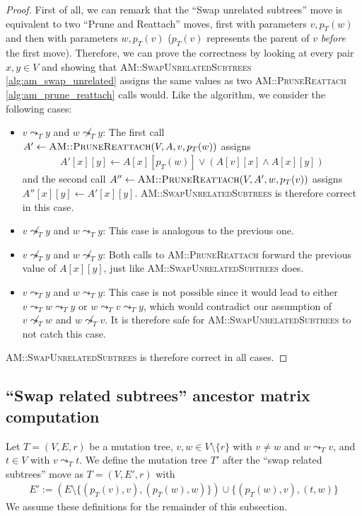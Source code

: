 \begin{proof}
    First of all, we can remark that the ``Swap unrelated subtrees'' move is equivalent to two ``Prune and Reattach'' moves, first with parameters $v, p_T(w)$ and then with parameters $w, p_T(v)$ ($p_T(v)$ represents the parent of $v$ \textit{before} the first move). Therefore, we can prove the correctness by looking at every pair $x,y \in V$ and showing that \textsc{AM::SwapUnrelatedSubtrees} \ref{alg:am_swap_unrelated} assigns the same values as two \textsc{AM::PruneReattach} \ref{alg:am_prune_reattach} calls would. Like the algorithm, we consider the following cases:
    \begin{itemize}
        \item $v \leadsto_T y$ and $w \not\leadsto_T y$: The first call $A' \leftarrow \textsc{AM::PruneReattach}(V, A, v, p_T(w))$ assigns 
        \begin{align*}
            A'[x][y] \leftarrow A[x][p_T(w)] \vee (A[v][x] \wedge A[x][y])
        \end{align*}
        and the second call $A'' \leftarrow \textsc{AM::PruneReattach}(V, A', w, p_T(v))$ assigns $A''[x][y] \leftarrow A'[x][y]$. \textsc{AM::SwapUnrelatedSubtrees} is therefore correct in this case.
        \item $v \not\leadsto_T y$ and $w \leadsto_T y$: This case is analogous to the previous one.
        \item $v \not\leadsto_T y$ and $w \not\leadsto_T y$: Both calls to \textsc{AM::PruneReattach} forward the previous value of $A[x][y]$, just like \textsc{AM::SwapUnrelatedSubtrees} does.
        \item $v \leadsto_T y$ and $w \leadsto_T y$: This case is not possible since it would lead to either $v \leadsto_T w \leadsto_T y$ or $w \leadsto_T v \leadsto_T y$, which would contradict our assumption of $v \not\leadsto_T w$ and $w \not\leadsto_T v$. It is therefore safe for \textsc{AM::SwapUnrelatedSubtrees} to not catch this case.
    \end{itemize}
    \textsc{AM::SwapUnrelatedSubtrees} is therefore correct in all cases.
\end{proof}

\subsection{``Swap related subtrees'' ancestor matrix computation}

\begin{definition}
    \label{def:swap_related_subtrees}
    Let $T = (V, E, r)$ be a mutation tree, $v, w \in V \setminus \{r\}$ with $v \neq w$ and $w \leadsto_T v$, and $t \in V$ with $v \leadsto_T t$. We define the mutation tree $T'$ after the ``swap related subtrees'' move as $T = (V, E', r)$ with
    \begin{align*}
        E' := (E \setminus \{(p_T(v), v), (p_T(w), w)\}) \cup \{(p_T(w), v), (t, w)\}
    \end{align*}
    We assume these definitions for the remainder of this subsection.
\end{definition}

